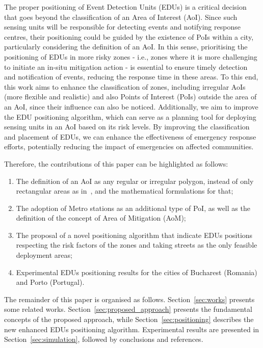 \begin{refsection}
The proper positioning of Event Detection Units (EDUs) is a critical decision that goes beyond the classification of an Area of Interest (AoI). Since such sensing units will be responsible for detecting events and notifying response centres, their positioning could be guided by the existence of PoIs within a city, particularly considering the definition of an AoI. In this sense, prioritising the positioning of EDUs in more risky zones - i.e., zones where it is more challenging to initiate an in-situ mitigation action - is essential to ensure timely detection and notification of events, reducing the response time in these areas. To this end, this work aims to enhance the classification of zones, including irregular AoIs (more flexible and realistic) and also Points of Interest (PoIs) outside the area of an AoI, since their influence can also be noticed. Additionally, we aim to improve the EDU positioning algorithm, which can serve as a planning tool for deploying sensing units in an AoI based on its risk levels. By improving the classification and placement of EDUs, we can enhance the effectiveness of emergency response efforts, potentially reducing the impact of emergencies on affected communities.

Therefore, the contributions of this paper can be highlighted as follows:

\begin{enumerate}
  \item The definition of an AoI as any regular or irregular polygon, instead of only rectangular areas as in~\cite{riskzones}, and the mathematical formulations for that;
  \item The adoption of Metro stations as an additional type of PoI, as well as the definition of the concept of Area of Mitigation (AoM);
  \item The proposal of a novel positioning algorithm that indicate EDUs positions respecting the risk factors of the zones and taking streets as the only feasible deployment areas;
  \item Experimental EDUs positioning results for the cities of Bucharest (Romania) and Porto (Portugal).
\end{enumerate}

The remainder of this paper is organised as follows. Section~\ref{sec:works} presents some related works. Section~\ref{sec:proposed_approach} presents the fundamental concepts of the proposed approach, while Section~\ref{sec:positioning} describes the new enhanced EDUs positioning algorithm. Experimental results are presented in Section~\ref{sec:simulation}, followed by conclusions and references.


\end{refsection}
